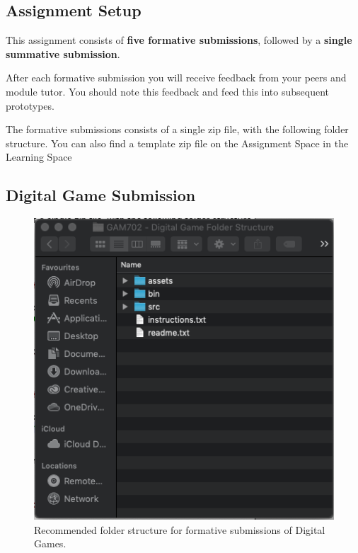 \documentclass{../../fal_assignment}
\begin{document}
\subsection*{Assignment Setup} 

This assignment consists of \textbf{five formative submissions}, followed by a \textbf{single summative submission}.

After each formative submission you will receive feedback from your peers and module tutor. You should note this feedback and feed this into subsequent prototypes.  

The formative submissions consists of a single zip file, with the following folder structure. You can also find a template zip file on the Assignment Space in the Learning Space

\pagebreak
\subsection*{Digital Game Submission} 

\begin{figure}[H]
	\begin{center}
		\includegraphics[height=0.4\textheight]{digital_games_folder_structure}
	\end{center}
	\caption{Recommended folder structure for formative submissions of Digital Games.}
	\label{fig:digital_game_folder_structure}
\end{figure}
\end{document}
